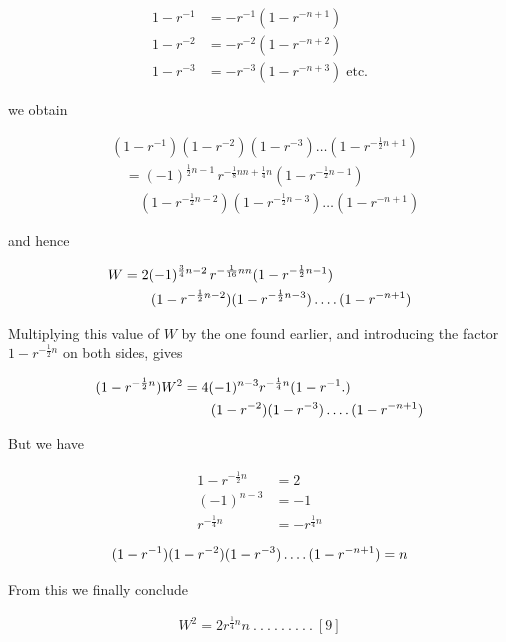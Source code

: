 \[
\begin{aligned}
1-r^{-1}&=-r^{-1}(1-r^{-n+1})\\
1-r^{-2}&=-r^{-2}(1-r^{-n+2})\\
1-r^{-3}&=-r^{-3}(1-r^{-n+3})\;\text{etc.}
\end{aligned}
\]

we obtain

\[
\begin{aligned}
&(1-r^{-1})(1-r^{-2})(1-r^{-3})\ldots(1-r^{-\frac12n+1})\\
&\quad=(-1)^{\frac12n-1}\,r^{-\frac18nn+\frac14n}(1-r^{-\frac12n-1})\\&\qquad(1-r^{-\frac12n-2})(1-r^{-\frac12n-3})\ldots(1-r^{-n+1})
\end{aligned}
\]

and hence

\[
\begin{aligned}
W&=2(-1)^{\frac34n-2}\,r^{-\frac1{16}nn}(1-r^{-\frac12n-1})\\&\qquad(1-r^{-\frac12n-2})(1-r^{-\frac12n-3})\mathinner{.\,.\,.\,.}(1-r^{-n+1})
\end{aligned}
\]

Multiplying this value of $W$ by the one found earlier, and introducing the factor $1-r^{-\frac12n}$ on both sides, gives

\[
\begin{aligned}
(1-r^{-\frac12n})W^2&=4(-1)^{n-3}r^{-\frac14n}(1-r^{-1}\mathord{.})\\&\qquad(1-r^{-2})(1-r^{-3})\mathinner{.\,.\,.\,.}(1-r^{-n+1})
\end{aligned}
\]

But we have

\[
\begin{aligned}
1-r^{-\frac12n}&=2\\
(-1)^{n-3}&=-1\\
r^{-\frac14n}&=-r^{\frac14n}
\end{aligned}
\]

\[
\begin{aligned}
(1-r^{-1})(1-r^{-2})(1-r^{-3})\mathinner{.\,.\,.\,.}(1-r^{-n+1})=n
\end{aligned}
\]

From this we finally conclude


\[
\begin{aligned}
W^2=2r^{\frac14n}n\  .\  .\  .\  .\  .\  .\  .\  .\  .\ [9]
\end{aligned}
\]

